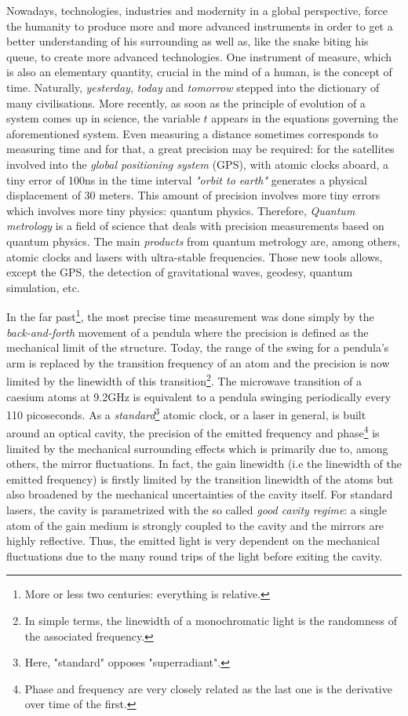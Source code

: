 \documentclass[10pt]{report}
\begin{document}
Nowadays, technologies, industries and modernity in a global perspective, force the humanity to produce more and more advanced instruments in order to get a better understanding of his surrounding as well as, like the snake biting his queue, to create more advanced technologies. One instrument of measure, which is also an elementary quantity, crucial in the mind of a human, is the concept of time. Naturally, \textit{yesterday}, \textit{today} and \textit{tomorrow} stepped into the dictionary of many civilisations. More recently, as soon as the principle of evolution of a system comes up in science, the variable $t$ appears in the equations governing the aforementioned system. Even measuring a distance sometimes corresponds to measuring time and for that, a great precision may be required: for the satellites involved into the \textit{global positioning system} (GPS), with atomic clocks aboard, a tiny error of 100ns in the time interval \textit{"orbit to earth"} generates a physical displacement of 30 meters. This amount of precision involves more tiny errors which involves more tiny physics: quantum physics. Therefore, \textit{Quantum metrology} is a field of science that deals with precision measurements based on quantum physics. The main \textit{products} from quantum metrology are, among others, atomic clocks and lasers with ultra-stable frequencies. Those new tools allows, except the GPS, the detection of gravitational waves, geodesy, quantum simulation, etc. 

In the far past\footnote{More or less two centuries: everything is relative.}, the most precise time measurement was done simply by the \textit{back-and-forth} movement of a pendula where the precision is defined as the mechanical limit of the structure. Today, the range of the swing for a pendula's arm is replaced by the transition frequency of an atom and the precision is now limited by the linewidth of this transition\footnote{In simple terms, the linewidth of a monochromatic light is the randomness of the associated frequency.}. The microwave transition of a caesium atoms at 9.2GHz is equivalent to a pendula swinging periodically every 110 picoseconds. As a \textit{standard}\footnote{Here, "standard" opposes "superradiant".} atomic clock, or a laser in general, is built around an optical cavity, the precision of the emitted frequency and phase\footnote{Phase and frequency are very closely related as the last one is the derivative over time of the first.} is limited by the mechanical surrounding effects which is primarily due to, among others, the mirror fluctuations. In fact, the gain linewidth (i.e the linewidth of the emitted frequency) is firstly limited by the transition linewidth of the atoms but also broadened by the mechanical uncertainties of the cavity itself. For standard lasers, the cavity is parametrized with the so called \textit{good cavity regime}: a single atom of the gain medium is strongly coupled to the cavity and the mirrors are highly reflective. Thus, the emitted light is very dependent on the mechanical fluctuations due to the many round trips of the light before exiting the cavity. 
\end{document}
